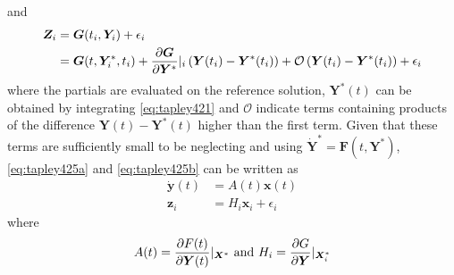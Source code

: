 and
\begin{equation}\label{eq:tapley425b}
  \begin{aligned}
  \bm{Z}_i &= \bm{G}(t_i, \bm{Y}_i) + \epsilon _i \\ 
           &= \bm{G}(t, \bm{Y}^{*}_{i}, t_i) 
           + \frac{\partial \bm{G}}{\partial \bm{Y}^{*}}|_{i} 
           \left( \bm{Y}(t_i) - \bm{Y}^{*}(t_i) \right) 
           + \mathcal{O}\left( \bm{Y}(t_i) - \bm{Y}^{*}(t_i) \right) 
           + \epsilon _i
  \end{aligned}
\end{equation}
where the partials are evaluated on the reference solution, $\bm{Y}^{*}(t)$ can be 
obtained by integrating \autoref{eq:tapley421} and $\mathcal{O}$ indicate terms 
containing products of the difference $\bm{Y}(t) - \bm{Y}^{*}(t)$ higher than the 
first term. Given that these terms are sufficiently small to be neglecting and using 
$ \bm{\dot{Y}}^{*} = \bm{F}(t, \bm{Y}^{*})$, \autoref{eq:tapley425a} and 
\autoref{eq:tapley425b} can be written as
\begin{equation}\label{eq:tapley426}
  \begin{aligned}
    \dot{\bm{y}}(t) &= A(t) \bm{x}(t) \\
    \bm{z}_i &= H_i \bm{x}_i + \epsilon _i
  \end{aligned}
\end{equation}
where 
\begin{equation}
  A(t) = \frac{\partial F (t)}{\partial \bm{Y}(t)}|_{\bm{X}^{*}} 
  \text{ and }
  H_i = \frac{\partial G}{\partial \bm{Y}}|_{\bm{X}^{*}_i}
\end{equation}
